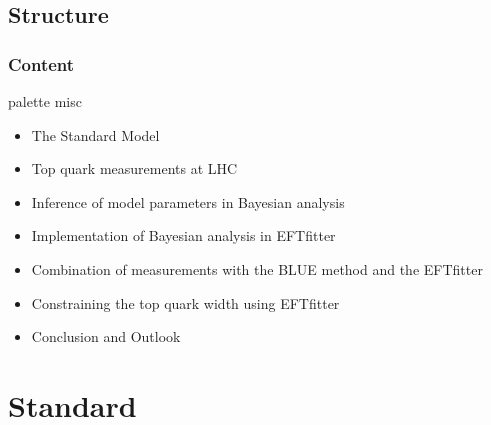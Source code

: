 \documentclass{beamer}
\begin{document}
\subsection{Structure}
\begin{frame}
	\frametitle{Content} \vspace{-3mm}
	\begin{beamercolorbox}[rounded=true,shadow=true]{palette misc}
		\begin{itemize}
			\item The Standard Model
			\item Top quark measurements at LHC
			\item Inference of model parameters in Bayesian analysis
			\item Implementation of Bayesian analysis in EFTfitter
			\item Combination of measurements with the BLUE method and the EFTfitter 
			\item Constraining the top quark width using EFTfitter
			\item Conclusion and Outlook
		\end{itemize}\vspace{2mm}
	\end{beamercolorbox}
\end{frame}

\section{Standard}
\end{document}
